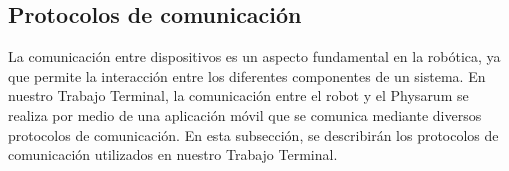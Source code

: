 \subsection{Protocolos de comunicaci\'on} %
\label{sub:Protocolos}
    La comunicaci\'on entre dispositivos es un aspecto fundamental en la rob\'otica, ya que permite la interacci\'on entre los diferentes 
        componentes de un sistema. En nuestro Trabajo Terminal, la comunicaci\'on entre el robot y el Physarum se realiza por medio de
        una aplicaci\'on m\'ovil que se comunica mediante diversos protocolos de comunicaci\'on. En esta subsecci\'on, se describir\'an
        los protocolos de comunicaci\'on utilizados en nuestro Trabajo Terminal.
    \vskip 0.5cm
    
    
    
